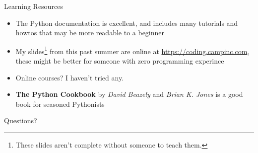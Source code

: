 \documentclass{lug}
\begin{document}
\begin{frame}{Learning Resources}
    \begin{itemize}[<+->]
        \item The Python documentation is excellent, and includes many
            tutorials and howtos that may be more readable to a beginner
        \item My slides\footnote{These slides aren't complete without someone
            to teach them.} from this past summer are online at
            \url{https://coding.campinc.com}, these might be better for someone
            with zero programming experince
        \item Online courses? I haven't tried any.
        \item \textbf{The Python Cookbook} by \emph{David Beazely} and
            \emph{Brian K. Jones} is a good book for seasoned Pythonists
    \end{itemize}
\end{frame}

\begin{frame}[standout]
    \Huge
    Questions?
\end{frame}
\end{document}
